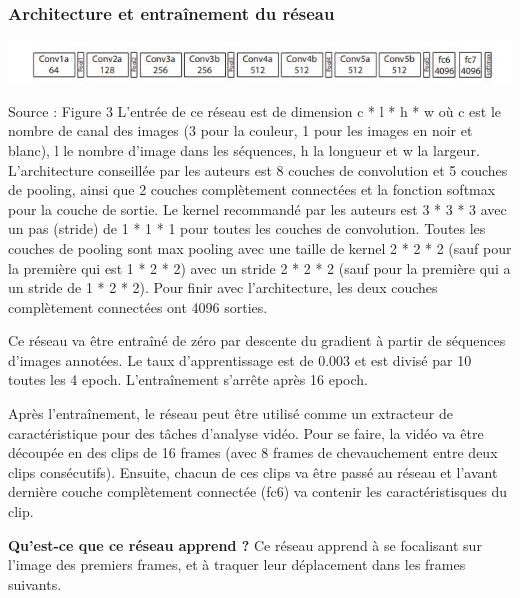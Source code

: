 \documentclass[11pt]{article}
\begin{document}
\subsubsection{Architecture et entraînement du réseau}
\label{sec:org4862e0f}
\begin{center}
\includegraphics[width=.9\linewidth]{c3d_architecture.jpg}
\end{center}
Source : Figure 3
L'entrée de ce réseau est de dimension c * l * h * w où c est le nombre de canal des images (3 pour la couleur, 1 pour les images en noir et blanc), l le nombre d'image dans les séquences, h la longueur et w la largeur.
L'architecture conseillée par les auteurs est 8 couches de convolution et 5 couches de pooling, ainsi que 2 couches complètement connectées et la fonction softmax pour la couche de sortie.
Le kernel recommandé par les auteurs est 3 * 3 * 3 avec un pas (stride) de 1 * 1 * 1 pour toutes les couches de convolution.
Toutes les couches de pooling sont max pooling avec une taille de kernel 2 * 2 * 2 (sauf pour la première qui est 1 * 2 * 2) avec un stride 2 * 2 * 2 (sauf pour la première qui a un stride de 1 * 2 * 2).
Pour finir avec l'architecture, les deux couches complètement connectées ont 4096 sorties.

Ce réseau va être entraîné de zéro par descente du gradient à partir de séquences d'images annotées.
Le taux d'apprentissage est de 0.003 et est divisé par 10 toutes les 4 epoch.
L'entraînement s'arrête après 16 epoch.

Après l'entraînement, le réseau peut être utilisé comme un extracteur de caractéristique pour des tâches d'analyse vidéo.
Pour se faire, la vidéo va être découpée en des clips de 16 frames (avec 8 frames de chevauchement entre deux clips consécutifs).
Ensuite, chacun de ces clips va être passé au réseau et l'avant dernière couche complètement connectée (fc6) va contenir les caractéristisques du clip.

\textbf{Qu'est-ce que ce réseau apprend ?} Ce réseau apprend à se focalisant sur l'image des premiers frames, et à traquer leur déplacement dans les frames suivants.
\end{document}
